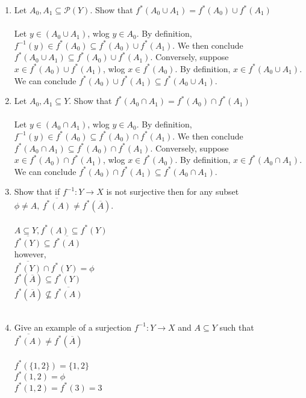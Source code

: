 \documentclass[11pt]{article}
\begin{document}
\begin{enumerate}
\begin{enumerate}
\item Let $A_0 , A_1 \subseteq \mathcal{P}(Y)$. Show that $f^*(A_0 \cup A_1 ) = f^*(A_0) \cup f^*(A_1)$
\\ \\
Let $y \in (A_0 \cup A_1)$, wlog $y \in A_0$.  By definition, $f^{-1}(y) \in f^*(A_0) \subseteq f^*(A_0) \cup f^*(A_1).$  We then conclude $f^*(A_0 \cup A_1) \subseteq f^*(A_0) \cup f^*(A_1)$.  Conversely, suppose $x \in f^*(A_0) \cup f^*(A_1)$, wlog $x \in f^*(A_0)$.  By definition, $x \in f^*(A_0 \cup A_1)$.  We can conclude $f^*(A_0) \cup f^*(A_1) \subseteq f^*(A_0 \cup A_1)$.
\\

\item Let $A_0 , A_1 \subseteq Y$. Show that $f^*(A_0 \cap A_1 ) = f^*(A_0) \cap f^*(A_1)$
\\ \\
Let $y \in (A_0 \cap A_1)$, wlog $y \in A_0$.  By definition, $f^{-1}(y) \in f^*(A_0) \subseteq f^*(A_0) \cap f^*(A_1).$  We then conclude $f^*(A_0 \cap A_1) \subseteq f^*(A_0) \cap f^*(A_1)$.  Conversely, suppose $x \in f^*(A_0) \cap f^*(A_1)$, wlog $x \in f^*(A_0)$.  By definition, $x \in f^*(A_0 \cap A_1)$.  We can conclude $f^*(A_0) \cap f^*(A_1) \subseteq f^*(A_0 \cap A_1)$.
\\


\item Show that if $f^{-1}:Y \to X$ is not surjective then for any subset $\phi \neq A,\   \overline{f^*(A)} \neq f^*(\overline{A})$.\\
\\
$A \subseteq Y, f^*(A) \subseteq f^*(Y)$\\
$\overline{f^*(Y)} \subseteq \overline{f^*(A)}$\\
however,\\
$\overline{f^*(Y)} \cap f^*(Y) = \phi$\\
$f^*(\overline{A}) \subseteq f^*(Y)$\\
$f^*(\overline{A}) \nsubseteq \overline{f^*(A)}$\\
\\
\item Give an example of a surjection $f^{-1}: Y \to X$ and $A \subseteq Y$ such that $\overline{f^*(A)} \neq f^*(\overline{A})$\\
\\
$f^*(\{1,2\}) = \{1,2\}$\\
$f^*(1,2) = \phi$\\
$f^*(1,2) = f^*(3) = 3$
\end{enumerate} %
\newpage


\end{enumerate}
\end{document}
